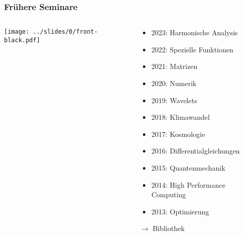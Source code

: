 %
%
%
\bgroup
\begin{frame}[t]
\setlength{\abovedisplayskip}{5pt}
\setlength{\belowdisplayskip}{5pt}
\frametitle{Frühere Seminare}
\vspace{-15pt}
\begin{columns}[t,onlytextwidth]
\begin{column}{0.44\textwidth}
\begin{center}
\texttt{[image: ../slides/0/front-black.pdf]}
\end{center}
\end{column}
\begin{column}{0.52\textwidth}
\begin{itemize}
\item {\color{gray}2023: Harmonische Analysis}
\item {\color{gray}2022: Spezielle Funktionen}
\item 2021: Matrizen
\item 2020: Numerik
\item 2019: Wavelets
\item 2018: Klimawandel
\item 2017: Kosmologie
\item 2016: Differentialgleichungen
\item 2015: Quantenmechanik
\item 2014: High Performance Computing
\item 2013: Optimierung
\end{itemize}
{$\rightarrow$ Bibliothek}
\end{column}
\end{columns}
\end{frame}
\egroup
